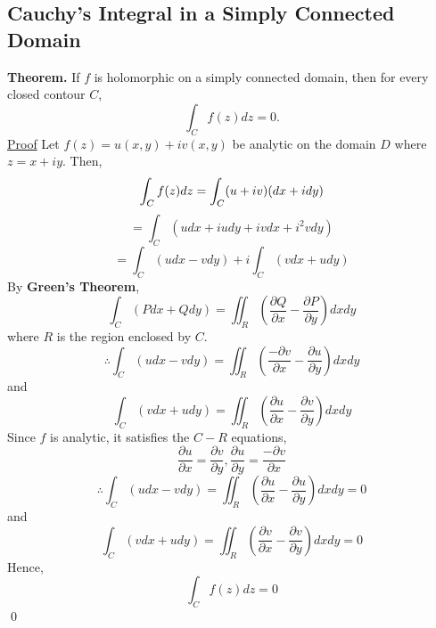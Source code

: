 \documentclass{article}
\begin{document}
\subsection{Cauchy's Integral in a Simply Connected Domain}
\textbf{Theorem.} If $f$ is holomorphic on a simply connected domain, then for every closed contour $C$,
\[
\int_{C}f(z)dz=0.
\]
\underline{Proof} Let $f(z)=u(x,y)+iv(x,y)$ be analytic on the domain $D$ where $z=x+iy$. Then,
\[
\int_{C}f(z)dz=\int_{C}(u+iv)(dx+idy)\\
\]
\[
=\int_{C}(udx+iudy+ivdx+i^2vdy)
\]
\[
=\int_{C}(udx-vdy)+i\int_{C}(vdx+udy)
\]
By \textbf{Green's Theorem},
\[
\int_{C}(Pdx+Qdy)=\iint_{R}(\frac{\partial Q}{\partial x}-\frac{\partial P}{\partial y})dxdy
\]
where $R$ is the region enclosed by $C$.
\[
\therefore \int_{C}(udx-vdy)=\iint_{R}(\frac{-\partial v}{\partial x}-\frac{\partial u}{\partial y})dxdy
\]
and
\[
\int_{C}(vdx+udy)=\iint_{R}(\frac{\partial u}{\partial x}-\frac{\partial v}{\partial y})dxdy
\]
Since $f$ is analytic, it satisfies the $C-R$ equations,
\[
\frac{\partial u}{\partial x}=\frac{\partial v}{\partial y}, \frac{\partial u}{\partial y}=\frac{-\partial v}{\partial x}
\]
\[
\therefore \int_{C}(udx-vdy)=\iint_{R}(\frac{\partial u}{\partial x}-\frac{\partial u}{\partial y})dxdy=0
\]
and
\[
\int_{C}(vdx+udy)=\iint_{R}(\frac{\partial v}{\partial x}-\frac{\partial v}{\partial y})dxdy=0
\]
Hence,
\[
\boxed{\int_{C}f(z)dz=0}
\]
\qed
\end{document}
